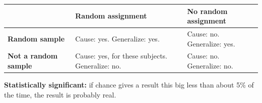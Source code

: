 \documentclass[11pt]{article}
\newcommand{\sumhead}[1]{\par\vspace{0.7em}{\large\bfseries #1}\par\vspace{0.3em}}
\begin{document}
\sumhead{What Can a Study Prove?}
\begin{tabular}{|L{1.4in}|L{2.5in}|L{2.55in}|}\hline
 & \textbf{Random assignment} & \textbf{No random assignment}\\ \hline
\textbf{Random sample} & Cause: yes. Generalize: yes. & Cause: no. Generalize: yes.\\ \hline
\textbf{Not a random sample} & Cause: yes, for these subjects. Generalize: no. & Cause: no. Generalize: no.\\ \hline
\end{tabular}

\vspace{0.5em}
\textbf{Statistically significant:} if chance gives a result this big less than about 5\% of the time, the result is probably real.
\end{document}
